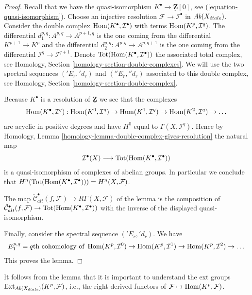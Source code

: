 \begin{proof}
Recall that we have the quasi-isomorphism
$K^\bullet \to \underline{\mathbf{Z}}[0]$, see
(\ref{equation-quasi-isomorphism}).
Choose an injective resolution $\mathcal{F} \to \mathcal{I}^\bullet$
in $\textit{Ab}(X_{\acute{e}tale})$. Consider the double complex
$\mathop{\mathrm{Hom}}\nolimits(K^\bullet, \mathcal{I}^\bullet)$ with terms
$\mathop{\mathrm{Hom}}\nolimits(K^p, \mathcal{I}^q)$. The differential
$d_1^{p, q} : A^{p, q} \to A^{p + 1, q}$
is the one coming from the differential $K^{p + 1} \to K^p$
and the differential $d_2^{p, q} : A^{p, q} \to A^{p, q + 1}$ is the
one coming from the differential
$\mathcal{I}^q \to \mathcal{I}^{q + 1}$.
Denote $\text{Tot}(\mathop{\mathrm{Hom}}\nolimits(K^\bullet, \mathcal{I}^\bullet))$
the associated total complex, see
Homology, Section \ref{homology-section-double-complexes}.
We will use the two spectral
sequences $({}'E_r, {}'d_r)$ and $({}''E_r, {}''d_r)$
associated to this double complex, see
Homology, Section \ref{homology-section-double-complex}.

\medskip\noindent
Because $K^\bullet$ is a resolution of $\underline{\mathbf{Z}}$
we see that the complexes
$$
\mathop{\mathrm{Hom}}\nolimits(K^\bullet, \mathcal{I}^q) :
\mathop{\mathrm{Hom}}\nolimits(K^0, \mathcal{I}^q) \to
\mathop{\mathrm{Hom}}\nolimits(K^1, \mathcal{I}^q) \to
\mathop{\mathrm{Hom}}\nolimits(K^2, \mathcal{I}^q) \to \ldots
$$
are acyclic in positive degrees and have $H^0$ equal to
$\Gamma(X, \mathcal{I}^q)$. Hence by
Homology, Lemma \ref{homology-lemma-double-complex-gives-resolution}
the natural map
$$
\mathcal{I}^\bullet(X) \longrightarrow
\text{Tot}(\mathop{\mathrm{Hom}}\nolimits(K^\bullet, \mathcal{I}^\bullet))
$$
is a quasi-isomorphism of complexes of abelian groups. In particular
we conclude that
$H^n(\text{Tot}(\mathop{\mathrm{Hom}}\nolimits(K^\bullet, \mathcal{I}^\bullet))) = H^n(X, \mathcal{F})$.

\medskip\noindent
The map $\check{\mathcal{C}}^\bullet_{alt}(f, \mathcal{F}) \to
R\Gamma(X, \mathcal{F})$ of the lemma is the composition of
$\check{\mathcal{C}}^\bullet_{alt}(f, \mathcal{F}) \to
\text{Tot}(\mathop{\mathrm{Hom}}\nolimits(K^\bullet, \mathcal{I}^\bullet))$
with the inverse of the displayed quasi-isomorphism.

\medskip\noindent
Finally, consider the spectral sequence $({}'E_r, {}'d_r)$.
We have
$$
E_1^{p, q} = q\text{th cohomology of }
\mathop{\mathrm{Hom}}\nolimits(K^p, \mathcal{I}^0) \to
\mathop{\mathrm{Hom}}\nolimits(K^p, \mathcal{I}^1) \to
\mathop{\mathrm{Hom}}\nolimits(K^p, \mathcal{I}^2) \to \ldots
$$
This proves the lemma.
\end{proof}

\noindent
It follows from the lemma that it is important to understand the
ext groups $\mathop{\mathrm{Ext}}\nolimits_{\textit{Ab}(X_{\acute{e}tale})}(K^p, \mathcal{F})$,
i.e., the right derived functors of
$\mathcal{F} \mapsto \mathop{\mathrm{Hom}}\nolimits(K^p, \mathcal{F})$.

